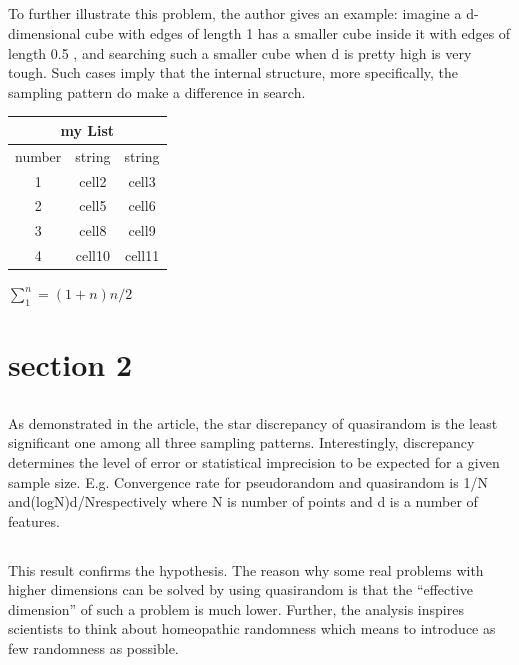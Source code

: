 \documentclass[10pt]{article}
\begin{document}
\subsection{}
\par To further illustrate this problem, the author gives an example: imagine a d-dimensional cube with edges of length 1 has a smaller cube inside it with edges of length 0.5 , and searching such a smaller cube when d is pretty high is very tough.  Such cases imply that the internal structure, more specifically, the sampling pattern do make a difference in search.
\begin{center}
\begin{tabular}{ |c|c|c| } 
 \hline
\multicolumn{3}{|c|}{my List} \\
 \hline
 number & string & string \\
 \hline
 1 & cell2 & cell3 \\ 
  \hline
 2 & cell5 & cell6 \\ 
  \hline
 3 & cell8 & cell9 \\ 
 \hline
 4 & cell10 & cell11 \\ 
  \hline
\end{tabular}
\end{center}
\(\sum_1^n=(1+n)n/2\)
\section{section 2}

\subsection{}
\par As demonstrated in the article, the star discrepancy of quasirandom is the least significant one among all three sampling patterns. Interestingly, discrepancy determines the level of error or statistical imprecision to be expected for a given sample size. E.g. Convergence rate for pseudorandom and quasirandom is 1/N and(logN)d/Nrespectively where N is number of points and d is a number of features. 

\subsection{}
\par This result confirms the hypothesis. The reason why  some real problems with higher dimensions can be solved by using quasirandom is that the “effective dimension” of such a problem is much lower. Further, the analysis inspires scientists to think about homeopathic randomness which means to introduce as few randomness as possible.
\end{document}
